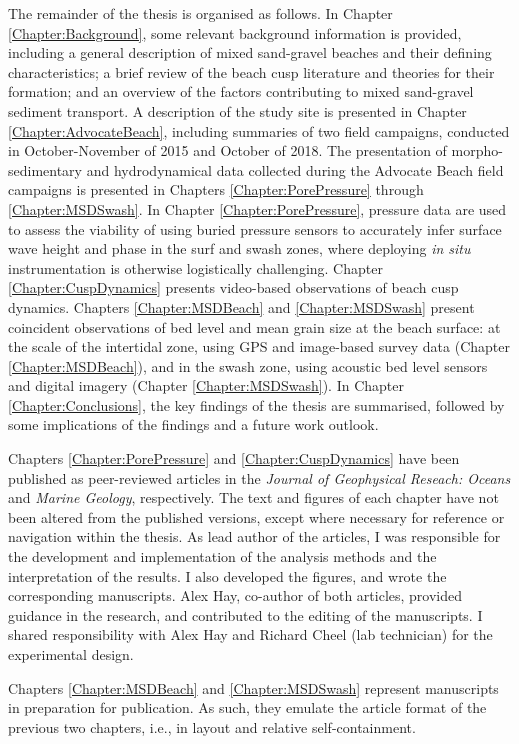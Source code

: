 The remainder of the thesis is organised as follows. In Chapter \ref{Chapter:Background}, some relevant background information is provided, including a general description of mixed sand-gravel beaches and their defining characteristics; a brief review of the beach cusp literature and theories for their formation; and an overview of the factors contributing to mixed sand-gravel sediment transport. A description of the study site is presented in Chapter \ref{Chapter:AdvocateBeach}, including summaries of two field campaigns, conducted in October-November of 2015 and October of 2018. The presentation of morpho-sedimentary and hydrodynamical data collected during the Advocate Beach field campaigns is presented in Chapters \ref{Chapter:PorePressure} through \ref{Chapter:MSDSwash}. In Chapter \ref{Chapter:PorePressure}, pressure data are used to assess the viability of using buried pressure sensors to accurately infer surface wave height and phase in the surf and swash zones, where deploying \textit{in situ} instrumentation is otherwise logistically challenging. Chapter \ref{Chapter:CuspDynamics} presents video-based observations of beach cusp dynamics. Chapters \ref{Chapter:MSDBeach} and \ref{Chapter:MSDSwash} present coincident observations of bed level and mean grain size at the beach surface: at the scale of the intertidal zone, using GPS and image-based survey data (Chapter \ref{Chapter:MSDBeach}), and in the swash zone, using acoustic bed level sensors and digital imagery (Chapter \ref{Chapter:MSDSwash}). In Chapter \ref{Chapter:Conclusions}, the key findings of the thesis are summarised, followed by some implications of the findings and a future work outlook.

Chapters \ref{Chapter:PorePressure} and \ref{Chapter:CuspDynamics} have been published as peer-reviewed articles \citep{Guest_Hay2017, Guest_Hay2019} in the \textit{Journal of Geophysical Reseach: Oceans} and \textit{Marine Geology}, respectively. The text and figures of each chapter have not been altered from the published versions, except where necessary for reference or navigation within the thesis. As lead author of the articles, I was responsible for the development and implementation of the analysis methods and the interpretation of the results. I also developed the figures, and wrote the corresponding manuscripts. Alex Hay, co-author of both articles, provided guidance in the research, and contributed to the editing of the manuscripts. I shared responsibility with Alex Hay and Richard Cheel (lab technician) for the experimental design.

Chapters \ref{Chapter:MSDBeach} and \ref{Chapter:MSDSwash} represent manuscripts in preparation for publication. As such, they emulate the article format of the previous two chapters, i.e., in layout and relative self-containment.

